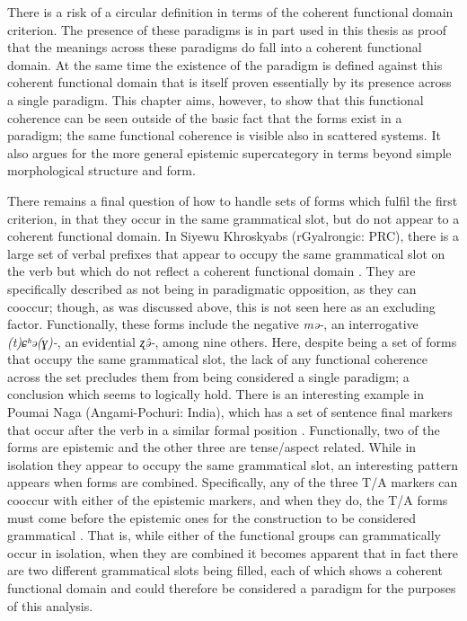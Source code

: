 There is a risk of a circular definition in terms of the coherent functional domain criterion. The presence of these paradigms is in part used in this thesis as proof that the meanings across these paradigms do fall into a coherent functional domain. At the same time the existence of the paradigm is defined against this coherent functional domain that is itself proven essentially by its presence across a single paradigm. This chapter aims, however, to show that this functional coherence can be seen outside of the basic fact that the forms exist in a paradigm; the same functional coherence is visible also in scattered systems. It also argues for the more general epistemic supercategory in terms beyond simple morphological structure and form.

There remains a final question of how to handle sets of forms which fulfil the first criterion, in that they occur in the same grammatical slot, but do not appear to a coherent functional domain. In Siyewu Khroskyabs (rGyalrongic: PRC), there is a large set of verbal prefixes that appear to occupy the same grammatical slot on the verb but which do not reflect a coherent functional domain \cite[34]{TaylorAdams2020}. They are specifically described as not being in paradigmatic opposition, as they can cooccur; though, as was discussed above, this is not seen here as an excluding factor. Functionally, these forms include the negative \textit{mə-}, an interrogative \textit{(t)ɕʰə(ɣ)-}, an evidential \textit{ʐə̂-}, among nine others. Here, despite being a set of forms that occupy the same grammatical slot, the lack of any functional coherence across the set precludes them from being considered a single paradigm; a conclusion which seems to logically hold. There is an interesting example in Poumai Naga (Angami-Pochuri: India), which has a set of sentence final markers that occur after the verb in a similar formal position \cite{Veikho2021}. Functionally, two of the forms are epistemic and the other three are tense/aspect related. While in isolation they appear to occupy the same grammatical slot, an interesting pattern appears when forms are combined. Specifically, any of the three T/A markers can cooccur with either of the epistemic markers, and when they do, the T/A forms must come before the epistemic ones for the construction to be considered grammatical \cite[278]{Veikho2021}. That is, while either of the functional groups can grammatically occur in isolation, when they are combined it becomes apparent that in fact there are two different grammatical slots being filled, each of which shows a coherent functional domain and could therefore be considered a paradigm for the purposes of this analysis.


